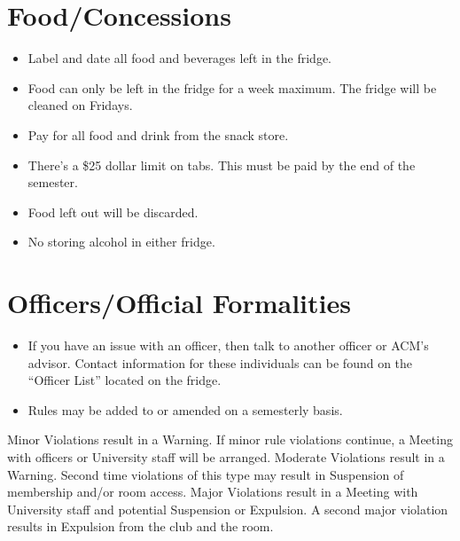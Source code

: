\section{Food/Concessions}
\begin{itemize}
	\item Label and date all food and beverages left in the fridge.
	\item Food can only be left in the fridge for a week maximum. The fridge will be cleaned on Fridays.
	\item Pay for all food and drink from the snack store.
	\item There’s a \$25 dollar limit on tabs. This must be paid by the end of the semester.
	\item Food left out will be discarded.
	\item No storing alcohol in either fridge.
\end{itemize}

\section{Officers/Official Formalities}
\begin{itemize}
	\item If you have an issue with an officer, then talk to another officer or ACM’s advisor. Contact information for these individuals can be found on the ``Officer List'' located on the fridge.
	\item Rules may be added to or amended on a semesterly basis.
\end{itemize}

Minor Violations result in a Warning. If minor rule violations continue, a Meeting with officers or University staff will be arranged.
Moderate Violations result in a Warning.  Second time violations of this type may result in Suspension of membership and/or room access.
Major Violations result in a Meeting with University staff and potential Suspension or Expulsion. A second major violation results in Expulsion from the club and the room.


